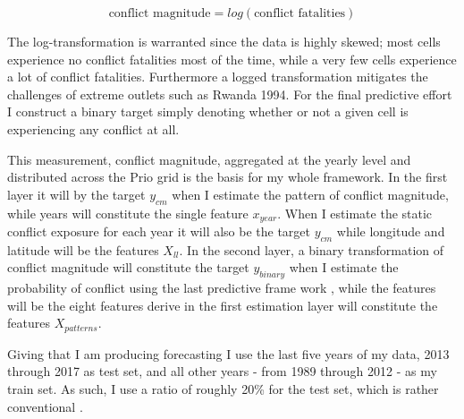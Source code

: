 \documentclass[a4paper]{article}
\begin{document}
\[
\text{conflict magnitude} = log(\text{conflict fatalities}) \tag{18} \label{eq:cm}
\]

The log-transformation is warranted since the data is highly skewed; most cells experience no conflict fatalities most of the time, while a very few cells experience a lot of conflict fatalities. Furthermore a logged transformation mitigates the challenges of extreme outlets such as Rwanda 1994. For the final predictive effort I construct a binary target simply denoting whether or not a given cell is experiencing any conflict at all.\par

This measurement, conflict magnitude, aggregated at the yearly level and distributed across the Prio grid is the basis for my whole framework. In the first layer it will by the target $y_{cm}$ when I estimate the pattern of conflict magnitude, while years will constitute the single feature $x_{year}$. When I estimate the static conflict exposure for each year it will also be the target $y_{cm}$ while longitude and latitude will be the features $X_{ll}$. In the second layer, a binary transformation of conflict magnitude will constitute the target $y_{binary}$ when I estimate the probability of conflict using the last predictive frame work , while the features will be the eight features derive in the first estimation layer will constitute the features $X_{patterns}$.\par

Giving that I am producing forecasting I use the last five years of my data, 2013 through 2017 as test set, and all other years - from 1989 through 2012 - as my train set.  As such, I use a ratio of roughly 20\% for the test set, which is rather conventional \citep{Friedman_2001, Ward_Greenhill_Bakke_2010}.\par

\end{document}

